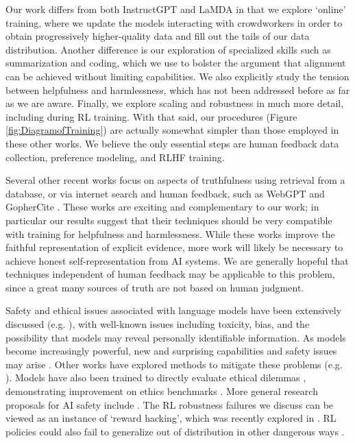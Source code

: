 Our work differs from both InstructGPT and LaMDA in that we explore `online' training, where we update the models interacting with crowdworkers in order to obtain progressively higher-quality data and fill out the tails of our data distribution.  Another difference is our exploration of specialized skills such as summarization and coding, which we use to bolster the argument that alignment can be achieved without limiting capabilities.  We also explicitly study the tension between helpfulness and harmlessness, which has not been addressed before as far as we are aware. Finally, we explore scaling and robustness in much more detail, including during RL training.  With that said, our procedures (Figure \ref{fig:DiagramofTraining}) are actually somewhat simpler than those employed in these other works.  We believe the only essential steps are human feedback data collection, preference modeling, and RLHF training.   

Several other recent works focus on aspects  of truthfulness using retrieval  \cite{RAG, REALM, Retro} from a database, or via internet search and human feedback, such as WebGPT \cite{WebGPT} and GopherCite \cite{GopherCite}.  These works are exciting and complementary to our work; in particular our results suggest that their techniques should be very compatible with training for helpfulness and harmlessness.  While these works improve the faithful representation of explicit evidence, more work will likely be necessary to achieve honest self-representation from AI systems.  We are generally hopeful that techniques independent of human feedback may be applicable to this problem, since a great many sources of truth are not based on human judgment.

Safety and ethical issues associated with language models have been extensively discussed (e.g. \cite{DBLP:journals/corr/abs-1711-09050, Parrots, IrvingLMEthics}), with well-known issues including toxicity, bias, and the possibility that models may reveal personally identifiable information.  As models become increasingly powerful, new and  surprising capabilities and safety issues may arise \cite{PredictabilitySurprise}.  Other works have explored methods to mitigate these problems (e.g. \cite{DBLP:journals/corr/abs-2105-03023, BAD}). Models have also been trained to directly evaluate ethical dilemmas \cite{Delphi}, demonstrating improvement on ethics benchmarks \cite{hendrycks2021aligning}. More general research proposals for AI safety include \cite{amodei2016concrete, hendrycks2021unsolved}.  The RL robustness failures we discuss can be viewed as an instance of `reward hacking', which was recently explored in \cite{RewardMisspecification}.  RL policies could also fail to generalize out of distribution in other dangerous ways \cite{ObjectiveRobustness}. 

